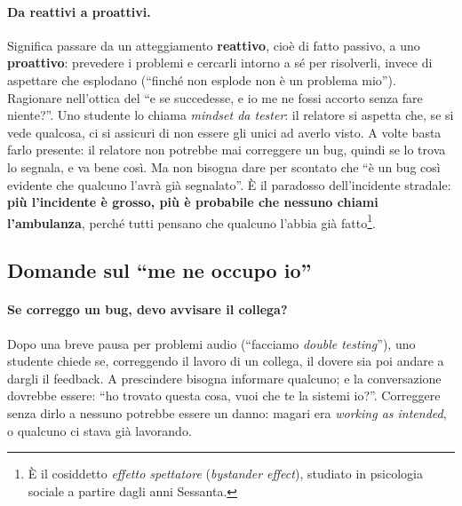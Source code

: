 \paragraph{Da reattivi a proattivi.} Significa passare da un atteggiamento \textbf{reattivo}, cioè di
fatto passivo, a uno \textbf{proattivo}: prevedere i problemi e cercarli intorno a sé per risolverli,
invece di aspettare che esplodano (``finché non esplode non è un problema mio''). Ragionare nell'ottica
del ``e se succedesse, e io me ne fossi accorto senza fare niente?''. Uno studente lo chiama
\emph{mindset da tester}: il relatore si aspetta che, se si vede qualcosa, ci si assicuri di non essere
gli unici ad averlo visto. A volte basta farlo presente: il relatore non potrebbe mai correggere un
bug, quindi se lo trova lo segnala, e va bene così. Ma non bisogna dare per scontato che ``è un bug così
evidente che qualcuno l'avrà già segnalato''. È il paradosso dell'incidente stradale: \textbf{più
l'incidente è grosso, più è probabile che nessuno chiami l'ambulanza}, perché tutti pensano che
qualcuno l'abbia già fatto\footnote{È il cosiddetto \emph{effetto spettatore} (\emph{bystander
effect}), studiato in psicologia sociale a partire dagli anni Sessanta.}.

\subsection{Domande sul ``me ne occupo io''}

\paragraph{Se correggo un bug, devo avvisare il collega?} Dopo una breve pausa per problemi audio
(``facciamo \emph{double testing}''), uno studente chiede se, correggendo il lavoro di un collega, il
dovere sia poi andare a dargli il feedback. A prescindere bisogna informare qualcuno; e la
conversazione dovrebbe essere: ``ho trovato questa cosa, vuoi che te la sistemi io?''. Correggere
senza dirlo a nessuno potrebbe essere un danno: magari era \emph{working as intended}, o qualcuno ci
stava già lavorando.

